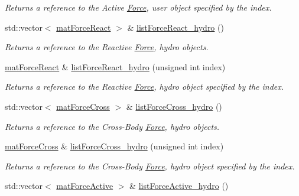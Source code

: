 \begin{DoxyCompactItemize}
\begin{DoxyCompactList}\small\item\em Returns a reference to the Active \hyperlink{classosea_1_1ofreq_1_1_force}{Force}, user object specified by the index. \end{DoxyCompactList}\item 
std\-::vector$<$ \hyperlink{classosea_1_1ofreq_1_1mat_force_react}{mat\-Force\-React} $>$ \& \hyperlink{classosea_1_1ofreq_1_1mat_body_abead59c1604f4581a977e086874b2e7a}{list\-Force\-React\-\_\-hydro} ()
\begin{DoxyCompactList}\small\item\em Returns a reference to the Reactive \hyperlink{classosea_1_1ofreq_1_1_force}{Force}, hydro objects. \end{DoxyCompactList}\item 
\hyperlink{classosea_1_1ofreq_1_1mat_force_react}{mat\-Force\-React} \& \hyperlink{classosea_1_1ofreq_1_1mat_body_a052f37c59ad093d92e1155e0b300d1aa}{list\-Force\-React\-\_\-hydro} (unsigned int index)
\begin{DoxyCompactList}\small\item\em Returns a reference to the Reactive \hyperlink{classosea_1_1ofreq_1_1_force}{Force}, hydro object specified by the index. \end{DoxyCompactList}\item 
std\-::vector$<$ \hyperlink{classosea_1_1ofreq_1_1mat_force_cross}{mat\-Force\-Cross} $>$ \& \hyperlink{classosea_1_1ofreq_1_1mat_body_a40e3fc33bc7b1685b7f1400312f88f88}{list\-Force\-Cross\-\_\-hydro} ()
\begin{DoxyCompactList}\small\item\em Returns a reference to the Cross-\/\-Body \hyperlink{classosea_1_1ofreq_1_1_force}{Force}, hydro objects. \end{DoxyCompactList}\item 
\hyperlink{classosea_1_1ofreq_1_1mat_force_cross}{mat\-Force\-Cross} \& \hyperlink{classosea_1_1ofreq_1_1mat_body_ad8ce408c1042c080cda0d50a3864fa54}{list\-Force\-Cross\-\_\-hydro} (unsigned int index)
\begin{DoxyCompactList}\small\item\em Returns a reference to the Cross-\/\-Body \hyperlink{classosea_1_1ofreq_1_1_force}{Force}, hydro object specified by the index. \end{DoxyCompactList}\item 
std\-::vector$<$ \hyperlink{classosea_1_1ofreq_1_1mat_force_active}{mat\-Force\-Active} $>$ \& \hyperlink{classosea_1_1ofreq_1_1mat_body_a9733e23db05aac47a42cfca88fc9d679}{list\-Force\-Active\-\_\-hydro} ()

\end{DoxyCompactItemize}
